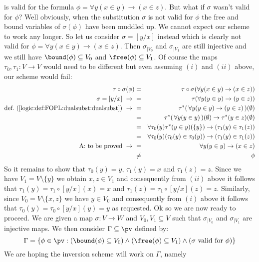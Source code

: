 is valid for the formula $\phi=\forall y(x\in y)\to(x\in z)$. But
what if $\sigma$ wasn't valid for $\phi$? Well obviously, when the
substitution $\sigma$ is not valid for $\phi$ the free and bound
variables of $\sigma(\phi)$ have been muddled up. We cannot expect
our scheme to work any longer. So let us consider $\sigma=[y/x]$
instead which is clearly not valid for $\phi=\forall y(x\in
y)\to(x\in z)$. Then $\sigma_{|V_{0}}$ and $\sigma_{|V_{1}}$ are
still injective and we still have $\bound(\phi)\subseteq V_{0}$ and
$\free(\phi)\subseteq V_{1}$. Of course the maps
$\tau_{0},\tau_{1}:V\to V$ would need to be different but even
assuming $(i)$ and $(ii)$ above, our scheme would fail:
    \begin{eqnarray*}\tau\circ\sigma(\phi)
        &=&\tau\circ\sigma(\forall y(x\in y)\to(x\in z))\\
        \sigma=[y/x]\ \to\ &=&\tau(\forall y(y\in y)\to(y\in z))\\
        \mbox{def.~(\ref{logic:def:FOPL:dualsubst:dualsubst})}\ \to\ 
        &=&\tau^{*}(\,\forall y(y\in y)\to(y\in z)\,)(\emptyset)\\
        &=&\tau^{*}(\,\forall y(y\in y)\,)(\emptyset)\to
           \tau^{*}(y\in z)(\emptyset)\\
        &=&\forall \tau_{0}(y)\tau^{*}(y\in y)(\{y\})\to
          (\tau_{1}(y)\in\tau_{1}(z))\\
        &=&\forall\tau_{0}(y)(\tau_{0}(y)\in\tau_{0}(y))\to
          (\tau_{1}(y)\in\tau_{1}(z))\\
        \mbox{A: to be proved}\ \to\ 
        &=&\forall y(y\in y)\to(x\in z)\\
        &\neq&\phi
    \end{eqnarray*}
So it remains to show that $\tau_{0}(y)=y$, $\tau_{1}(y)=x$ and
$\tau_{1}(z)=z$. Since we have $V_{1}=V\setminus\{y\}$ we obtain
$x,z\in V_{1}$ and consequently from $(ii)$ above it follows that
$\tau_{1}(y)=\tau_{1}\circ[y/x](x)=x$ and
$\tau_{1}(z)=\tau_{1}\circ[y/x](z)=z$. Similarly, since
$V_{0}=V\setminus\{x,z\}$ we have $y\in V_{0}$ and consequently from
$(i)$ above it follows that $\tau_{0}(y)=\tau_{0}\circ[y/x](y)=y$
as requested. Ok so we are now ready to proceed. We are given a map
$\sigma:V\to W$ and $V_{0}, V_{1}\subseteq V$ such that
$\sigma_{|V_{0}}$ and $\sigma_{|V_{1}}$ are injective maps. We then
consider $\Gamma\subseteq\pv$ defined by:
    \[
    \Gamma=\{\phi\in\pv:(\bound(\phi)\subseteq
    V_{0})\land(\free(\phi)\subseteq V_{1})\land(\mbox{$\sigma$
    valid for $\phi$})\}
    \]
We are hoping the inversion scheme will work on $\Gamma$, namely
